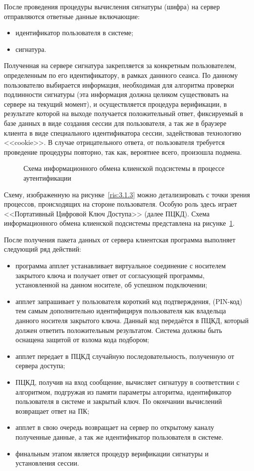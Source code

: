 После проведения процедуры вычисления сигнатуры (шифра) на сервер отправляются
ответные данные включающие:
\begin{itemize}
  \item идентификатор пользователя в системе;
  \item сигнатура.
\end{itemize}

Полученная на сервере сигнатура закрепляется за конкретным пользователем,
определенным по его идентификатору, в рамках даннного сеанса. По данному
пользователю выбирается информация, необходимая для алгоритма проверки
подлинности сигнатуры (эта информация должна целиком существовать на сервере на
текущий момент), и осуществляется процедура верификации, в результате которой на
выходе получается положительный ответ, фиксируемый в базе данных в виде
создания сессии для пользователя, а так же в браузере клиента в виде
специального идентификатора сессии, задействовав технологию <<cookie>>.
В случае отрицательного ответа, от пользователя требуется проведение процедуры повторно, так как, вероятнее всего,
произошла подмена.

\begin{figure}[h!]
\center{\texttt{[image: 3-1-4]}}
\caption{Схема информационного обмена клиенской подсистемы в процессе
аутентификации}
\label{ris:3.1.4}
\end{figure} 

Схему, изображенную на рисунке~\ref{ris:3.1.3} можно детализировать с точки
зрения процессов, происходящих на стороне пользователя. Особую роль здесь играет
<<Портативный Цифровой Ключ Доступа>> (далее ПЦКД). Схема информационного обмена
клиенской подсистемы представлена на рисунке~\ref{ris:3.1.4}.

После получения пакета данных от сервера клиентская программа выполняет следующий ряд действий:
\begin{itemize}
  \item программа апплет устанавливает виртуальное соединение с носителем закрытого
ключа и получает ответ от согласующей программы, установленной на данном
носителе, об успешном подключении;
\item апплет запрашивает у пользователя короткий
код подтверждения, (PIN-код) тем самым дополнительно идентифицируя пользователя
как владельца данного носителя закрытого ключа. Данный код передаётся в
ПЦКД, который должен ответить положительным результатом. Система должны быть
оснащена защитой от взлома кода подбором;
\item апплет передает в ПЦКД случайную последовательность, полученную от
сервера доступа;
\item ПЦКД, получив на вход сообщение, вычисляет сигнатуру в соответствии с
алгоритмом, подгружая из памяти параметры алгоритма, идентификатор пользователя
в системе и закрытый ключ.
По окончании вычислений возвращает ответ на ПК;
\item апплет в свою очередь возвращает на сервер по открытому каналу полученные
данные, а так же идентификатор пользователя в системе.
\item финальным этапом является процедур верификации сигнатуры и установления
сессии.
\end{itemize}

